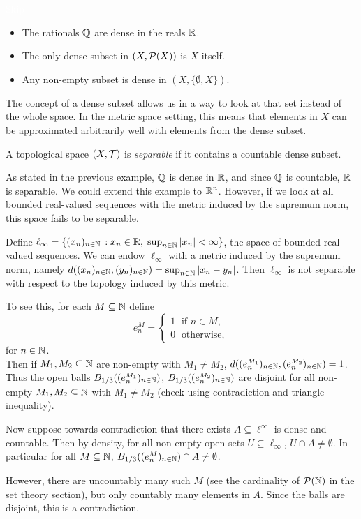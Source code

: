 \documentclass{article}
\begin{document}
\begin{example}
\textcolor{white}{Skip}
\begin{itemize}
    \item The rationals ${\mathbb{Q}}$ are dense in the reals ${\mathbb{R}}$. 
    \item The only dense subset in $(X,\mathcal{P}(X))$ is $X$ itself.
    \item Any non-empty subset is dense in $(X,\{\emptyset,X\})$.
\end{itemize}
\end{example}

The concept of a dense subset allows us in a way to look at that set instead of the whole space. In the metric space setting, this means that elements in $X$ can be approximated arbitrarily well with elements from the dense subset.

\begin{definition}
A topological space $(X,\mathcal{T})$ is \emph{separable} if it contains a countable dense subset.
\end{definition}

As stated in the previous example, ${\mathbb{Q}}$ is dense in ${\mathbb{R}}$, and since ${\mathbb{Q}}$ is countable, ${\mathbb{R}}$ is separable. We could extend this example to ${\mathbb{R}}^n$. However, if we look at all bounded real-valued sequences with the metric induced by the supremum norm, this space fails to be separable. 

\begin{example}
Define $\ell_\infty=\{ (x_n)_{n\in {\mathbb{N}}} \, : x_n \in {\mathbb{R}} , \; \sup_{n\in {\mathbb{N}}} \vert x_n \vert <\infty \}$, the space of bounded real valued sequences. We can endow $\ell_\infty$ with a metric induced by the supremum norm, namely $d((x_n)_{n\in {\mathbb{N}}}, (y_n)_{n\in {\mathbb{N}}}) = \sup_{n\in {\mathbb{N}}} \vert x_n-y_n\vert$. 
Then $\ell_\infty$ is not separable with respect to the topology induced by this metric. 

To see this, for each $M\subseteq {\mathbb{N}}$ define 
\begin{equation*}
    e^M_n = \begin{cases} 1 \; \text{ if } n \in M,\\
    0 \; \text{ otherwise},
    \end{cases}
\end{equation*}
for $n \in {\mathbb{N}}$.  \\
Then if $M_1, M_2\subseteq {\mathbb{N}}$ are non-empty with $M_1\neq M_2$, $d((e^{M_1}_n)_{n\in {\mathbb{N}}},(e^{M_2}_n)_{n\in {\mathbb{N}}}) = 1$. Thus the open balls $B_{1/3}((e^{M_1}_n)_{n \in {\mathbb{N}}})$, $B_{1/3}((e^{M_2}_n)_{n \in {\mathbb{N}}})$ are disjoint for all non-empty $M_1, M_2\subseteq {\mathbb{N}}$ with $M_1\neq M_2$ (check using contradiction and triangle inequality).

Now suppose towards contradiction that there exists $A \subseteq \ell^\infty$ is dense and countable.  Then by density, for all non-empty open sets $U\subseteq \ell_\infty$, $U\cap A \neq \emptyset$.  In particular for all $M \subseteq {\mathbb{N}}$, $B_{1/3}((e^{M}_n)_{n \in {\mathbb{N}}})\cap A \neq \emptyset$. 

However, there are uncountably many such $M$ (see the cardinality of $\mathcal{P}({\mathbb{N}})$ in the set theory section), but only countably many elements in $A$. Since the balls are disjoint, this is a contradiction. 
\end{example}
\end{document}
